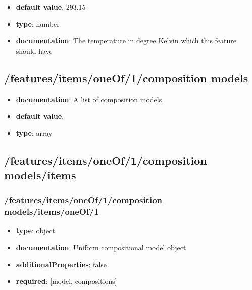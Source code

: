 \begin{itemize}\item {\bf default value}: 293.15
\item {\bf type}: number
\item {\bf documentation}: The temperature in degree Kelvin which this feature should have
\end{itemize}\subsection{/features/items/oneOf/1/composition models}
\begin{itemize}\item {\bf documentation}: A list of composition models.
\item {\bf default value}: 
\item {\bf type}: array
\end{itemize}\subsection{/features/items/oneOf/1/composition models/items}

\subsubsection{/features/items/oneOf/1/composition models/items/oneOf/1}
\begin{itemize}\item {\bf type}: object
\item {\bf documentation}: Uniform compositional model object
\item {\bf additionalProperties}: false
\item {\bf required}: [model, compositions]\end{itemize}
